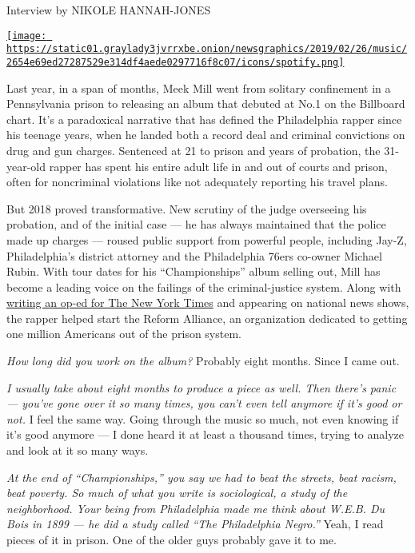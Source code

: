 Interview by NIKOLE HANNAH-JONES

\href{https://open.spotify.com/track/45CCe4gu08OYG1I4MH8TU6}{\texttt{[image: https://static01.graylady3jvrrxbe.onion/newsgraphics/2019/02/26/music/2654e69ed27287529e314df4aede0297716f8c07/icons/spotify.png]}}

Last year, in a span of months, Meek Mill went from solitary confinement
in a Pennsylvania prison to releasing an album that debuted at No.1 on
the Billboard chart. It's a paradoxical narrative that has defined the
Philadelphia rapper since his teenage years, when he landed both a
record deal and criminal convictions on drug and gun charges. Sentenced
at 21 to prison and years of probation, the 31-year-old rapper has spent
his entire adult life in and out of courts and prison, often for
noncriminal violations like not adequately reporting his travel plans.

But 2018 proved transformative. New scrutiny of the judge overseeing his
probation, and of the initial case --- he has always maintained that the
police made up charges --- roused public support from powerful people,
including Jay-Z, Philadelphia's district attorney and the Philadelphia
76ers co-owner Michael Rubin. With tour dates for his ``Championships''
album selling out, Mill has become a leading voice on the failings of
the criminal-justice system. Along with
\href{https://www.nytimes3xbfgragh.onion/2018/11/26/opinion/meek-mill-criminal-justice-reform.html}{writing
an op-ed for The New York Times} and appearing on national news shows,
the rapper helped start the Reform Alliance, an organization dedicated
to getting one million Americans out of the prison system.

\emph{How long did you work on the album?} Probably eight months. Since
I came out.

\emph{I usually take about eight months to produce a piece as well. Then
there's panic --- you've gone over it so many times, you can't even tell
anymore if it's good or not.} I feel the same way. Going through the
music so much, not even knowing if it's good anymore --- I done heard it
at least a thousand times, trying to analyze and look at it so many
ways.

\emph{At the end of ``Championships,'' you say we had to beat the
streets, beat racism, beat poverty. So much of what you write is
sociological, a study of the neighborhood. Your being from Philadelphia
made me think about W.E.B. Du Bois in 1899 --- he did a study called
``The Philadelphia Negro.''} Yeah, I read pieces of it in prison. One of
the older guys probably gave it to me.

